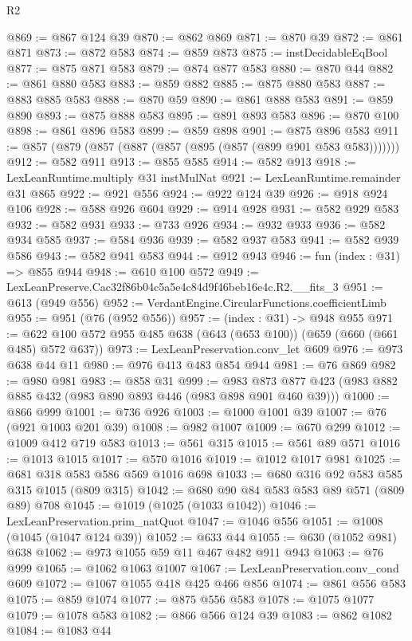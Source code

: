 \begin{lexlean}{R2}
\begin{coremodule}
@869 := @867 @124 @39
@870 := @862 @869
@871 := @870 @39
@872 := @861 @871
@873 := @872 @583
@874 := @859 @873
@875 := instDecidableEqBool
@877 := @875 @871 @583
@879 := @874 @877 @583
@880 := @870 @44
@882 := @861 @880 @583
@883 := @859 @882
@885 := @875 @880 @583
@887 := @883 @885 @583
@888 := @870 @59
@890 := @861 @888 @583
@891 := @859 @890
@893 := @875 @888 @583
@895 := @891 @893 @583
@896 := @870 @100
@898 := @861 @896 @583
@899 := @859 @898
@901 := @875 @896 @583
@911 := @857 (@879 (@857 (@887 (@857 (@895 (@857 (@899 @901 @583 @583)))))))
@912 := @582 @911
@913 := @855 @585
@914 := @582 @913
@918 := LexLeanRuntime.multiply @31 instMulNat
@921 := LexLeanRuntime.remainder @31 @865
@922 := @921 @556
@924 := @922 @124 @39
@926 := @918 @924 @106
@928 := @588 @926 @604
@929 := @914 @928
@931 := @582 @929 @583
@932 := @582 @931
@933 := @733 @926
@934 := @932 @933
@936 := @582 @934 @585
@937 := @584 @936
@939 := @582 @937 @583
@941 := @582 @939 @586
@943 := @582 @941 @583
@944 := @912 @943
@946 := fun (index : @31) => @855 @944
@948 := @610 @100 @572
@949 := LexLeanPreserve.Cac32f86b04c5a5e4c84d9f46beb16e4c.R2.__fits_3
@951 := @613 (@949 @556)
@952 := VerdantEngine.CircularFunctions.coefficientLimb
@955 := @951 (@76 (@952 @556))
@957 := (index : @31) -> @948 @955
@971 := @622 @100 @572 @955 @485 @638 (@643 (@653 @100)) (@659 (@660 (@661 @485) @572 @637))
@973 := LexLeanPreservation.conv_let @609
@976 := @973 @638 @44 @11
@980 := @976 @413 @483 @854 @944
@981 := @76 @869
@982 := @980 @981
@983 := @858 @31
@999 := @983 @873 @877 @423 (@983 @882 @885 @432 (@983 @890 @893 @446 (@983 @898 @901 @460 @39)))
@1000 := @866 @999
@1001 := @736 @926
@1003 := @1000 @1001 @39
@1007 := @76 (@921 @1003 @201 @39)
@1008 := @982 @1007
@1009 := @670 @299
@1012 := @1009 @412 @719 @583
@1013 := @561 @315
@1015 := @561 @89 @571
@1016 := @1013 @1015
@1017 := @570 @1016
@1019 := @1012 @1017 @981
@1025 := @681 @318 @583 @586 @569 @1016 @698
@1033 := @680 @316 @92 @583 @585 @315 @1015 (@809 @315)
@1042 := @680 @90 @84 @583 @583 @89 @571 (@809 @89) @708
@1045 := @1019 (@1025 (@1033 @1042))
@1046 := LexLeanPreservation.prim_natQuot
@1047 := @1046 @556
@1051 := @1008 (@1045 (@1047 @124 @39))
@1052 := @633 @44
@1055 := @630 (@1052 @981) @638
@1062 := @973 @1055 @59 @11 @467 @482 @911 @943
@1063 := @76 @999
@1065 := @1062 @1063 @1007
@1067 := LexLeanPreservation.conv_cond @609
@1072 := @1067 @1055 @418 @425 @466 @856
@1074 := @861 @556 @583
@1075 := @859 @1074
@1077 := @875 @556 @583
@1078 := @1075 @1077
@1079 := @1078 @583
@1082 := @866 @566 @124 @39
@1083 := @862 @1082
@1084 := @1083 @44

\end{coremodule}
\end{lexlean}
